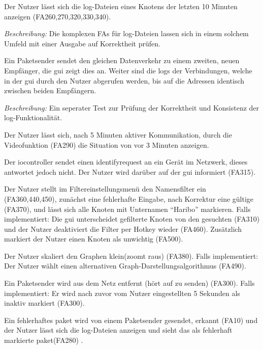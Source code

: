 \begin{description}[style=multiline, leftmargin=4cm, labelwidth=4cm]
   Der Nutzer lässt sich die \gls{log}-Dateien eines Knotens der letzten 10 Minuten anzeigen (FA260,270,320,330,340). \par
      \textit{Beschreibung:} Die komplexen FAs für \gls{log}-Dateien lassen sich in einem solchem Umfeld mit einer Ausgabe auf Korrektheit prüfen.
  
   Ein Paketsender sendet den gleichen Datenverkehr zu einem zweiten, neuen Empfänger, die \gls{gui} zeigt dies an. Weiter sind die \glspl{log} der Verbindungen, welche in der \gls{gui} durch den Nutzer abgerufen werden, bis auf die Adressen identisch zwischen beiden Empfängern. \par
      \textit{Beschreibung:} Ein seperater Test zur Prüfung der Korrektheit und Konsistenz der \gls{log}-Funktionalität.
  
   Der Nutzer lässt sich, nach 5 Minuten aktiver Kommunikation, durch die Videofunktion (FA290) die Situation von vor 3 Minuten anzeigen.
  
   Der \gls{iocontroller} sendet einen \gls{identifyrequest} an ein Gerät im Netzwerk, dieses antwortet jedoch nicht. Der Nutzer wird darüber auf der \gls{gui} informiert (FA315).
  
   Der Nutzer stellt im Filtereinstellungsmenü den Namensfilter ein (FA360,440,450), zunächst eine fehlerhafte Eingabe, nach Korrektur eine gültige (FA370), und lässt sich alle Knoten mit Unternamen “Haribo” markieren. Falls implementiert: Die \gls{gui} unterscheidet gefilterte Knoten von den gesuchten (FA310) und der Nutzer deaktiviert die Filter per Hotkey wieder (FA460). Zusätzlich markiert der Nutzer einen Knoten als unwichtig (FA500).
  
   Der Nutzer skaliert den Graphen klein(zoomt raus) (FA380). Falls implementiert: Der Nutzer wählt einen alternativen Graph-Darstellungsalgorithmus (FA490).
  
   Ein Paketsender wird aus dem Netz entfernt (hört auf zu senden) (FA300). Falls implementiert: Er wird nach zuvor vom Nutzer eingestellten 5 Sekunden als inaktiv markiert (FA300).
  
   Ein fehlerhaftes \gls{paket} wird von einem Paketsender gesendet, erkannt (FA10) und der Nutzer lässt sich die \gls{log}-Dateien anzeigen und sieht das als fehlerhaft markierte \gls{paket}(FA280) .
  

\end{description}
